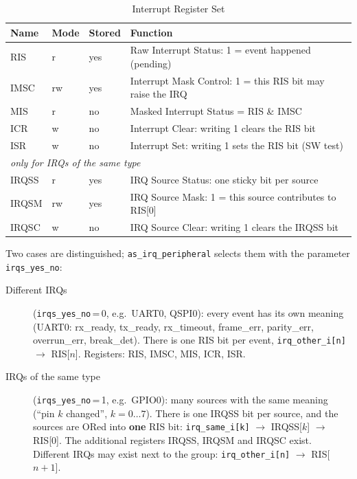 \begin{table}[H]
\caption{Interrupt Register Set}
\label{tab:archirq01}
\centering
\begin{tabularx}{\textwidth}{|l|l|l|X|}
  \hline
  Name & Mode & Stored & Function \\
  \hline
  \hline
  RIS   & r  & yes & Raw Interrupt Status: 1 = event happened (pending) \\
  \hline
  IMSC  & rw & yes & Interrupt Mask Control: 1 = this RIS bit may raise the IRQ \\
  \hline
  MIS   & r  & no  & Masked Interrupt Status = RIS \& IMSC \\
  \hline
  ICR   & w  & no  & Interrupt Clear: writing 1 clears the RIS bit \\
  \hline
  ISR   & w  & no  & Interrupt Set: writing 1 sets the RIS bit (SW test) \\
  \hline
  \hline
  \multicolumn{4}{|l|}{\textit{only for IRQs of the same type}} \\
  \hline
  IRQSS & r  & yes & IRQ Source Status: one sticky bit per source \\
  \hline
  IRQSM & rw & yes & IRQ Source Mask: 1 = this source contributes to RIS[0] \\
  \hline
  IRQSC & w  & no  & IRQ Source Clear: writing 1 clears the IRQSS bit \\
  \hline
\end{tabularx}
\end{table}

Two cases are distinguished; \texttt{as\_irq\_peripheral} selects them with
the parameter \texttt{irqs\_yes\_no}:
\begin{description}
  \item[Different IRQs] (\texttt{irqs\_yes\_no}\,=\,0, e.g.\ UART0, QSPI0):
    every event has its own meaning (UART0: rx\_ready, tx\_ready, rx\_timeout,
    frame\_err, parity\_err, overrun\_err, break\_det). There is one RIS bit per
    event, \texttt{irq\_other\_i[n]} $\rightarrow$ RIS[$n$]. Registers: RIS,
    IMSC, MIS, ICR, ISR.
  \item[IRQs of the same type] (\texttt{irqs\_yes\_no}\,=\,1, e.g.\ GPIO0):
    many sources with the same meaning (``pin $k$ changed'', $k=0\ldots7$).
    There is one IRQSS bit per source, and the sources are ORed into
    \textbf{one} RIS bit:
    \texttt{irq\_same\_i[k]} $\rightarrow$ IRQSS[$k$] $\rightarrow$ RIS[0].
    The additional registers IRQSS, IRQSM and IRQSC exist. Different IRQs may
    exist next to the group: \texttt{irq\_other\_i[n]} $\rightarrow$ RIS[$n+1$].
\end{description}

